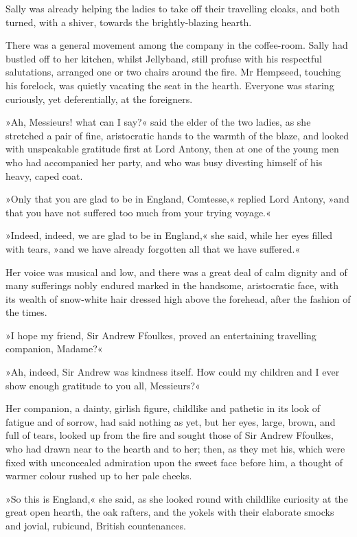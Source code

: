 Sally was already helping the ladies to take off their travelling cloaks, and both turned, with a shiver, towards the brightly-blazing hearth.

There was a general movement among the company in the coffee-room. Sally had bustled off to her kitchen, whilst Jellyband, still profuse with his respectful salutations, arranged one or two chairs around the fire. Mr Hempseed, touching his forelock, was quietly vacating the seat in the hearth. Everyone was staring curiously, yet deferentially, at the foreigners.

»Ah, Messieurs! what can I say?« said the elder of the two ladies, as she stretched a pair of fine, aristocratic hands to the warmth of the blaze, and looked with unspeakable gratitude first at Lord Antony, then at one of the young men who had accompanied her party, and who was busy divesting himself of his heavy, caped coat.

»Only that you are glad to be in England, Comtesse,« replied Lord Antony, »and that you have not suffered too much from your trying voyage.«

»Indeed, indeed, we are glad to be in England,« she said, while her eyes filled with tears, »and we have already forgotten all that we have suffered.«

Her voice was musical and low, and there was a great deal of calm dignity and of many sufferings nobly endured marked in the handsome, aristocratic face, with its wealth of snow-white hair dressed high above the forehead, after the fashion of the times.

»I hope my friend, Sir Andrew Ffoulkes, proved an entertaining travelling companion, Madame?«

»Ah, indeed, Sir Andrew was kindness itself. How could my children and I ever show enough gratitude to you all, Messieurs?«

Her companion, a dainty, girlish figure, childlike and pathetic in its look of fatigue and of sorrow, had said nothing as yet, but her eyes, large, brown, and full of tears, looked up from the fire and sought those of Sir Andrew Ffoulkes, who had drawn near to the hearth and to her; then, as they met his, which were fixed with unconcealed admiration upon the sweet face before him, a thought of warmer colour rushed up to her pale cheeks.

»So this is England,« she said, as she looked round with childlike curiosity at the great open hearth, the oak rafters, and the yokels with their elaborate smocks and jovial, rubicund, British countenances.

